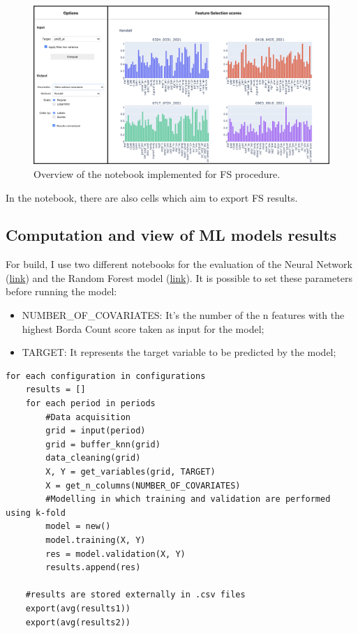 \begin{figure}[H]
    \centering
    \includegraphics[scale=0.40]{images/notebook.png}
    \caption{Overview of the notebook implemented for FS procedure.}
    \label{fig:notebook}
\end{figure}

In the notebook, there are also cells which aim to export FS results.

\subsection{Computation and view of ML models results}
For build, I use two different notebooks for the evaluation of the Neural Network (\href{https://github.com/opengeolab/D-DUST/blob/thesis_MB/notebooks/Keras_prediction_model.ipynb}{link}) and the Random Forest model (\href{https://github.com/opengeolab/D-DUST/blob/thesis_MB/notebooks/RandomForest_prediction_model.ipynb}{link}). 
It is possible to set these parameters before running the model:
\begin{itemize}
    \item NUMBER\_OF\_COVARIATES: It's the number of the n features with the highest Borda Count score taken as input for the model;
    \item TARGET: It represents the target variable to be predicted by the model;
\end{itemize}
\begin{verbatim}
for each configuration in configurations
    results = []
    for each period in periods
        #Data acquisition
        grid = input(period)
        grid = buffer_knn(grid)
        data_cleaning(grid)
        X, Y = get_variables(grid, TARGET)
        X = get_n_columns(NUMBER_OF_COVARIATES)
        #Modelling in which training and validation are performed using k-fold
        model = new()
        model.training(X, Y)
        res = model.validation(X, Y)
        results.append(res)
    
    #results are stored externally in .csv files
    export(avg(results1))
    export(avg(results2))
 
\end{verbatim}

